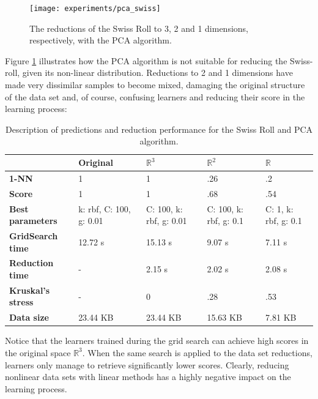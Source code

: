 \begin{figure}[H]
	\centering
	\captionsetup{justification=centering}
	\texttt{[image: experiments/pca\_swiss]}
	\caption{The reductions of the Swiss Roll to 3, 2 and 1 dimensions, respectively, with the PCA algorithm.}
	\label{fig:dsswisspca}
\end{figure}

Figure \ref{fig:dsswisspca} illustrates how the PCA algorithm is not suitable for reducing the Swiss-roll, given its non-linear distribution. Reductions to 2 and 1 dimensions have made very dissimilar samples to become mixed, damaging the original structure of the data set and, of course, confusing learners and reducing their score in the learning process:

\begin{table}[H]
	\centering
	
	\begin{tabular}{|p{.20\linewidth}|p{.15\linewidth}|p{.15\linewidth}|p{.15\linewidth}|p{.15\linewidth}|}
		\hline
		& \textbf{Original} & $\mathbb{R}^3$ & $\mathbb{R}^2$ & $\mathbb{R}$ \\\hline
		\textbf{1-NN} & 1 & 1 & .26 & .2 \\\hline
		\textbf{Score} & 1 & 1 & .68 & .54 \\\hline
		\textbf{Best parameters} & k: rbf, C: 100, g: 0.01 & C: 100, k: rbf, g: 0.01 & C: 100, k: rbf, g: 0.1 & C: 1, k: rbf, g: 0.1\\\hline
		\textbf{GridSearch time} & 12.72 s & 15.13 s & 9.07 s & 7.11 s \\\hline
		\textbf{Reduction time} & - & 2.15 s & 2.02 s & 2.08 s\\\hline
		\textbf{Kruskal's stress} & - & 0 & .28 & .53 \\\hline
		\textbf{Data size} & 23.44 KB & 23.44 KB & 15.63 KB & 7.81 KB \\\hline
	\end{tabular}
	\captionsetup{justification=centering}
	\caption{Description of predictions and reduction performance for the Swiss Roll and PCA algorithm.}
\end{table}

Notice that the learners trained during the grid search can achieve high scores in the original space $\mathbb{R}^3$. When the same search is applied to the data set reductions, learners only manage to retrieve significantly lower scores. Clearly, reducing nonlinear data sets with linear methods has a highly negative impact on the learning process.

